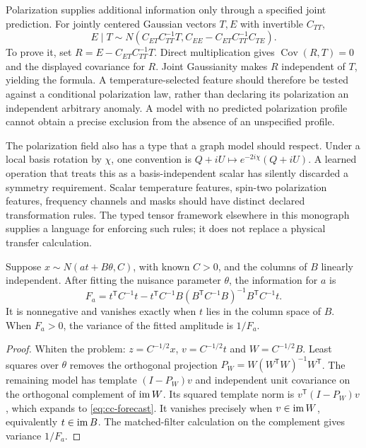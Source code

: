 Polarization supplies additional information only through a specified
joint prediction. For jointly centered Gaussian vectors $T,E$ with invertible
$C_{TT}$,
\begin{equation}
 E\mid T\sim N\left(C_{ET}C_{TT}^{-1}T,
 C_{EE}-C_{ET}C_{TT}^{-1}C_{TE}\right).
 \label{eq:cc-conditional-polarization}
\end{equation}
To prove it, set $R=E-C_{ET}C_{TT}^{-1}T$. Direct multiplication gives
$\operatorname{Cov}(R,T)=0$ and the displayed covariance for $R$.
Joint Gaussianity makes $R$ independent of $T$, yielding the formula.
A temperature-selected feature should therefore be tested against a
conditional polarization law, rather than declaring its polarization
an independent arbitrary anomaly. A model with no predicted polarization
profile cannot obtain a precise exclusion from the absence of an
unspecified profile.

The polarization field also has a type that a graph model should respect.
Under a local basis rotation by $\chi$, one convention is
$Q+iU\mapsto e^{-2i\chi}(Q+iU)$. A learned operation that treats this
as a basis-independent scalar has silently discarded a symmetry
requirement. Scalar temperature features, spin-two polarization features,
frequency channels and masks should have distinct declared transformation
rules. The typed tensor framework elsewhere in this monograph supplies
a language for enforcing such rules; it does not replace a physical
transfer calculation.

\begin{proposition}
\label{prop:cc-forecast}
Suppose $x\sim N(a t+B\theta,C)$, with known $C>0$, and the columns of
$B$ linearly independent. After fitting the nuisance parameter $\theta$,
the information for $a$ is
\begin{equation}
 F_a=t^{\mathsf T}C^{-1}t
 -t^{\mathsf T}C^{-1}B(B^{\mathsf T}C^{-1}B)^{-1}B^{\mathsf T}C^{-1}t.
 \label{eq:cc-forecast}
\end{equation}
It is nonnegative and vanishes exactly when $t$ lies in the column space
of $B$. When $F_a>0$, the variance of the fitted amplitude is $1/F_a$.
\end{proposition}

\begin{proof}
Whiten the problem: $z=C^{-1/2}x$, $v=C^{-1/2}t$ and
$W=C^{-1/2}B$. Least squares over $\theta$ removes the orthogonal
projection $P_W=W(W^{\mathsf T}W)^{-1}W^{\mathsf T}$. The remaining
model has template $(I-P_W)v$ and independent unit covariance on the
orthogonal complement of $\operatorname{im} W$. Its squared template norm is
$v^{\mathsf T}(I-P_W)v$, which expands to \eqref{eq:cc-forecast}.
It vanishes precisely when $v\in\operatorname{im} W$, equivalently $t\in\operatorname{im} B$.
The matched-filter calculation on the complement gives variance $1/F_a$.
\end{proof}

